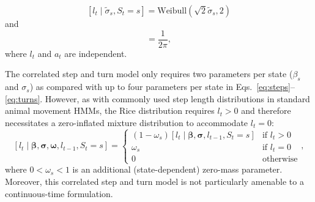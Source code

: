 \documentclass[12pt]{article}\usepackage[]{graphicx}\usepackage[]{xcolor}
\begin{document}
\begin{equation}
  [l_t \mid \tilde{\sigma}_s, S_t = s] = \text{Weibull}\left(\sqrt{2}\tilde{\sigma}_s, 2 \right)%
\end{equation}
and
\begin{equation}
  [a_t] = \frac{1}{2\pi},
\end{equation}
where $l_t$ and $a_t$ are independent. 

The correlated step and turn model only requires two parameters per state ($\beta_s$ and $\sigma_s$) as compared with up to four parameters per state in Eqs.\ \ref{eq:steps}--\ref{eq:turns}. However, as with commonly used step length distributions in standard animal movement HMMs, the Rice distribution requires $l_t>0$ and therefore %
necessitates a zero-inflated mixture distribution to accommodate $l_t=0$:
\begin{equation}
  \label{eq:zi}
  \left[l_t \mid \boldsymbol{\beta}, \boldsymbol{\sigma}, \boldsymbol{\omega}, l_{t-1}, S_t = s\right] =
  \begin{cases}
  \left(1-\omega_s \right) \left[l_t \mid \boldsymbol{\beta}, \boldsymbol{\sigma}, l_{t-1}, S_t = s\right] & \text{if } l_t >0 \\
  \omega_s & \text{if } l_t = 0 \\
  0 & \text{otherwise}
  \end{cases},
\end{equation}
where $0<\omega_s<1$ is an additional (state-dependent) zero-mass parameter. Moreover, this correlated step and turn model is not particularly amenable to a continuous-time formulation.
\end{document}
